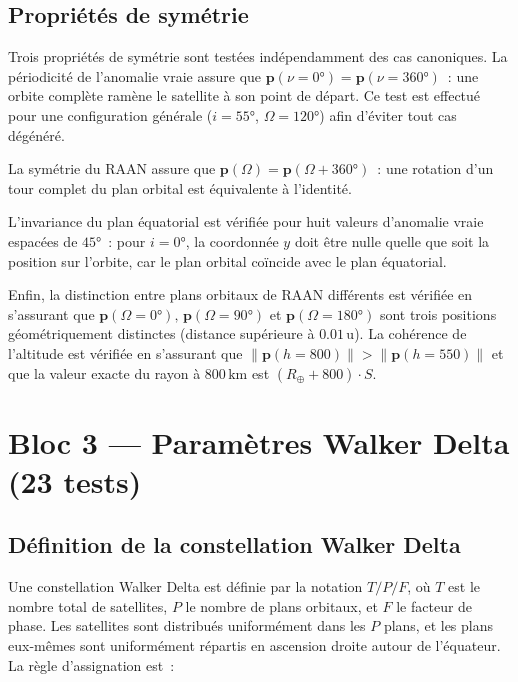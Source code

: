 \documentclass[12pt,a4paper]{article}
\begin{document}
\subsection{Propriétés de symétrie}

Trois propriétés de symétrie sont testées indépendamment des cas canoniques. La périodicité de l'anomalie vraie assure que $\mathbf{p}(\nu = 0°) = \mathbf{p}(\nu = 360°)$~: une orbite complète ramène le satellite à son point de départ. Ce test est effectué pour une configuration générale ($i = 55°$, $\Omega = 120°$) afin d'éviter tout cas dégénéré.

La symétrie du RAAN assure que $\mathbf{p}(\Omega) = \mathbf{p}(\Omega + 360°)$~: une rotation d'un tour complet du plan orbital est équivalente à l'identité.

L'invariance du plan équatorial est vérifiée pour huit valeurs d'anomalie vraie espac\'{e}es de $45°$~: pour $i = 0°$, la coordonnée $y$ doit être nulle quelle que soit la position sur l'orbite, car le plan orbital coïncide avec le plan équatorial.

Enfin, la distinction entre plans orbitaux de RAAN différents est vérifiée en s'assurant que $\mathbf{p}(\Omega = 0°),\, \mathbf{p}(\Omega = 90°)$ et $\mathbf{p}(\Omega = 180°)$ sont trois positions géométriquement distinctes (distance supérieure à $0.01\,\text{u}$). La cohérence de l'altitude est vérifiée en s'assurant que $\|\mathbf{p}(h = 800)\| > \|\mathbf{p}(h = 550)\|$ et que la valeur exacte du rayon à $800\,\text{km}$ est $(R_\oplus + 800) \cdot S$.

\section{Bloc 3 — Paramètres Walker Delta (23 tests)}

\subsection{Définition de la constellation Walker Delta}

Une constellation Walker Delta est définie par la notation $T/P/F$, où $T$ est le nombre total de satellites, $P$ le nombre de plans orbitaux, et $F$ le facteur de phase. Les satellites sont distribués uniformément dans les $P$ plans, et les plans eux-mêmes sont uniformément répartis en ascension droite autour de l'équateur. La règle d'assignation est~:
\end{document}
